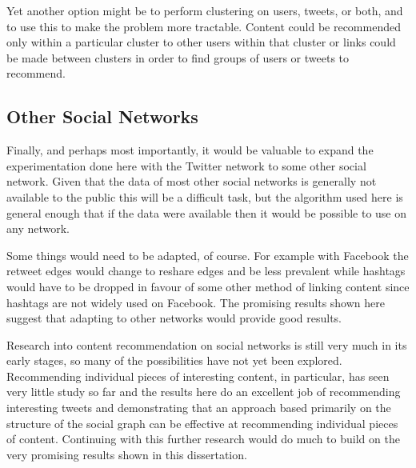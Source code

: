 Yet another option might be to perform clustering on users, tweets, or both, and to use this to make the problem more tractable. Content could be recommended only within a particular cluster to other users within that cluster or links could be made between clusters in order to find groups of users or tweets to recommend.

\subsection{Other Social Networks}

Finally, and perhaps most importantly, it would be valuable to expand the experimentation done here with the Twitter network to some other social network. Given that the data of most other social networks is generally not available to the public this will be a difficult task, but the algorithm used here is general enough that if the data were available then it would be possible to use on any network.

Some things would need to be adapted, of course. For example with Facebook the retweet edges would change to reshare edges and be less prevalent while hashtags would have to be dropped in favour of some other method of linking content since hashtags are not widely used on Facebook. The promising results shown here suggest that adapting to other networks would provide good results.

Research into content recommendation on social networks is still very much in its early stages, so many of the possibilities have not yet been explored. Recommending individual pieces of interesting content, in particular, has seen very little study so far and the results here do an excellent job of recommending interesting tweets and demonstrating that an approach based primarily on the structure of the social graph can be effective at recommending individual pieces of content. Continuing with this further research would do much to build on the very promising results shown in this dissertation. 

